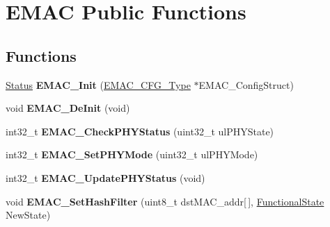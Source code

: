 \hypertarget{group___e_m_a_c___public___functions}{\section{\-E\-M\-A\-C \-Public \-Functions}
\label{group___e_m_a_c___public___functions}
}
\subsection*{\-Functions}
\begin{DoxyCompactItemize}
\item 
\hypertarget{group___e_m_a_c___public___functions_ga0aa0e60db6822c59fc8482d8698baab4}{\hyperlink{group___l_p_c___types___public___types_ga67a0db04d321a74b7e7fcfd3f1a3f70b}{\-Status} {\bfseries \-E\-M\-A\-C\-\_\-\-Init} (\hyperlink{struct_e_m_a_c___c_f_g___type}{\-E\-M\-A\-C\-\_\-\-C\-F\-G\-\_\-\-Type} $\ast$\-E\-M\-A\-C\-\_\-\-Config\-Struct)}\label{group___e_m_a_c___public___functions_ga0aa0e60db6822c59fc8482d8698baab4}

\item 
\hypertarget{group___e_m_a_c___public___functions_ga30378e9ea98ec05e89e5567985ba752d}{void {\bfseries \-E\-M\-A\-C\-\_\-\-De\-Init} (void)}\label{group___e_m_a_c___public___functions_ga30378e9ea98ec05e89e5567985ba752d}

\item 
\hypertarget{group___e_m_a_c___public___functions_gab1e8b36d16bc87beea87a637777dd8ea}{int32\-\_\-t {\bfseries \-E\-M\-A\-C\-\_\-\-Check\-P\-H\-Y\-Status} (uint32\-\_\-t ul\-P\-H\-Y\-State)}\label{group___e_m_a_c___public___functions_gab1e8b36d16bc87beea87a637777dd8ea}

\item 
\hypertarget{group___e_m_a_c___public___functions_ga4b06c4c3f311e1e8fd18bd1e6b268ef4}{int32\-\_\-t {\bfseries \-E\-M\-A\-C\-\_\-\-Set\-P\-H\-Y\-Mode} (uint32\-\_\-t ul\-P\-H\-Y\-Mode)}\label{group___e_m_a_c___public___functions_ga4b06c4c3f311e1e8fd18bd1e6b268ef4}

\item 
\hypertarget{group___e_m_a_c___public___functions_ga362d181dcc2f697c551f2698a64e4d16}{int32\-\_\-t {\bfseries \-E\-M\-A\-C\-\_\-\-Update\-P\-H\-Y\-Status} (void)}\label{group___e_m_a_c___public___functions_ga362d181dcc2f697c551f2698a64e4d16}

\item 
\hypertarget{group___e_m_a_c___public___functions_gad636e7c2b7a47e9ebea226d13a9f88b3}{void {\bfseries \-E\-M\-A\-C\-\_\-\-Set\-Hash\-Filter} (uint8\-\_\-t dst\-M\-A\-C\-\_\-addr\mbox{[}$\,$\mbox{]}, \hyperlink{group___l_p_c___types___public___types_gac9a7e9a35d2513ec15c3b537aaa4fba1}{\-Functional\-State} \-New\-State)}\label{group___e_m_a_c___public___functions_gad636e7c2b7a47e9ebea226d13a9f88b3}


\end{DoxyCompactItemize}
